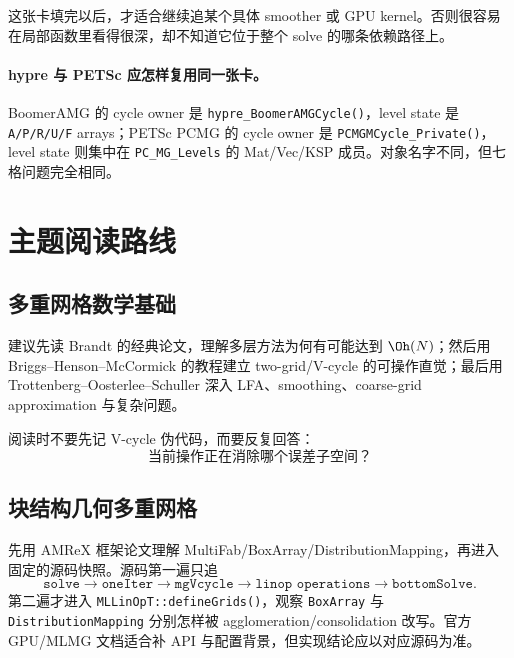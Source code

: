 这张卡填完以后，才适合继续追某个具体 smoother 或 GPU kernel。否则很容易在局部函数里看得很深，却不知道它位于整个 solve 的哪条依赖路径上。

\paragraph{hypre 与 PETSc 应怎样复用同一张卡。}
BoomerAMG 的 cycle owner 是 \texttt{hypre\_BoomerAMGCycle()}，level state 是 \texttt{A/P/R/U/F} arrays；PETSc PCMG 的 cycle owner 是 \texttt{PCMGMCycle\_Private()}，level state 则集中在 \texttt{PC\_MG\_Levels} 的 Mat/Vec/KSP 成员。对象名字不同，但七格问题完全相同。

\section{主题阅读路线}

\subsection{多重网格数学基础}

建议先读 Brandt 的经典论文，理解多层方法为何有可能达到 $\Oh(N)$；然后用 Briggs--Henson--McCormick 的教程建立 two-grid/V-cycle 的可操作直觉；最后用 Trottenberg--Oosterlee--Schuller 深入 LFA、smoothing、coarse-grid approximation 与复杂问题\cite{brandt1977,briggs2000,trottenberg2001}。

阅读时不要先记 V-cycle 伪代码，而要反复回答：
\begin{equation}
\text{当前操作正在消除哪个误差子空间？}
\end{equation}

\subsection{块结构几何多重网格}

先用 AMReX 框架论文理解 MultiFab/BoxArray/DistributionMapping，再进入固定的源码快照\cite{zhang2019amrex,zhang2021amrex}。源码第一遍只追
\begin{equation}
\boxed{
\texttt{solve}
\rightarrow
\texttt{oneIter}
\rightarrow
\texttt{mgVcycle}
\rightarrow
\texttt{linop operations}
\rightarrow
\texttt{bottomSolve}.
}
\end{equation}
第二遍才进入 \texttt{MLLinOpT::defineGrids()}，观察 \texttt{BoxArray} 与 \texttt{DistributionMapping} 分别怎样被 agglomeration/consolidation 改写。官方 GPU/MLMG 文档适合补 API 与配置背景，但实现结论应以对应源码为准\cite{amrexGPUdocs2026,amrexMLMGdocs2026}。

